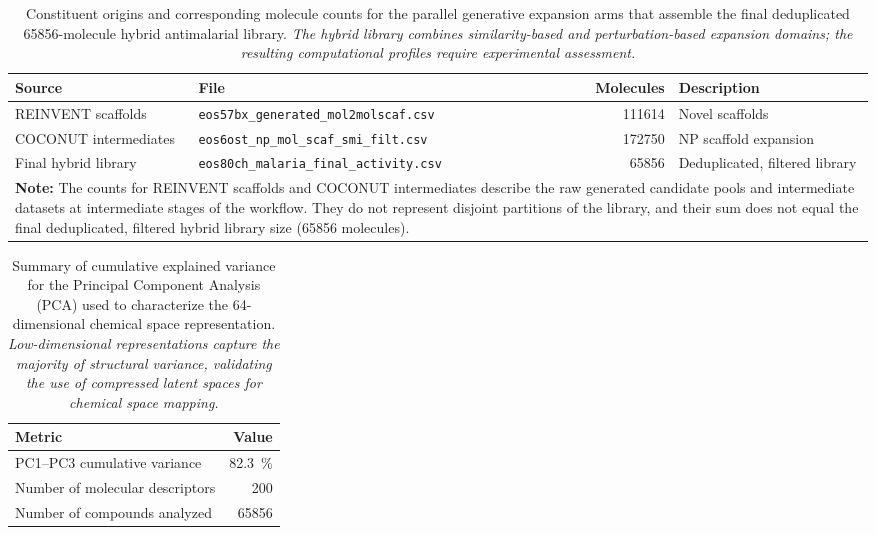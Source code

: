 \documentclass[journal=jcisd8,manuscript=suppinfo]{achemso}
\begin{document}
\begin{table}[!htbp]
\centering
\caption{Constituent origins and corresponding molecule counts for the parallel generative expansion arms that assemble the final deduplicated \num{65856}-molecule hybrid antimalarial library. \textit{The hybrid library combines similarity-based and perturbation-based expansion domains; the resulting computational profiles require experimental assessment.}}
\label{tab:source_breakdown}
\small
\begin{tabular}{@{}m{3cm} m{7cm}@{}r m{4cm}@{}}
\toprule
\textbf{Source} & \textbf{File} & \textbf{Molecules} & \textbf{Description} \\
\midrule
REINVENT scaffolds & \texttt{eos57bx\_generated\_mol2molscaf.csv} & \num{111614} & Novel scaffolds \\
COCONUT intermediates & \texttt{eos6ost\_np\_mol\_scaf\_smi\_filt.csv} & \num{172750} & NP scaffold expansion \\
Final hybrid library & \texttt{eos80ch\_malaria\_final\_activity.csv} & \num{65856} & Deduplicated, filtered library \\
\bottomrule
\multicolumn{4}{p{17cm}}{
\noindent\textbf{Note:} The counts for REINVENT scaffolds and COCONUT intermediates describe the raw generated candidate pools and intermediate datasets at intermediate stages of the workflow. They do not represent disjoint partitions of the library, and their sum does not equal the final deduplicated, filtered hybrid library size (\num{65856} molecules).
}
\end{tabular}
\end{table}

\begin{table}[!htbp]
\centering
\caption{Summary of cumulative explained variance for the Principal Component Analysis (PCA) used to characterize the \num{64}-dimensional chemical space representation. \textit{Low-dimensional representations capture the majority of structural variance, validating the use of compressed latent spaces for chemical space mapping.}}
\label{tab:pca_variance}
\begin{tabular}{@{}l r@{}}
\toprule
\textbf{Metric} & \textbf{Value} \\
\midrule
PC1--PC3 cumulative variance & \qty{82.3}{\percent} \\
Number of molecular descriptors & \num{200} \\
Number of compounds analyzed & \num{65856} \\
\bottomrule
\end{tabular}
\end{table}
\end{document}
